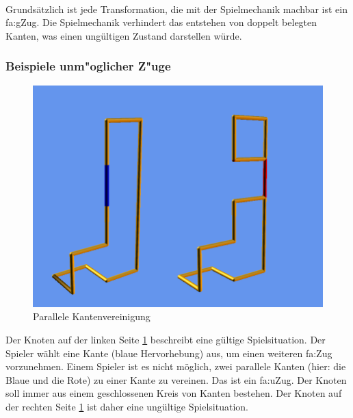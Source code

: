 ~\\
Grundsätzlich ist jede Transformation, die mit der Spielmechanik machbar ist ein \gls{fa:gZug}.
Die Spielmechanik verhindert das entstehen von doppelt belegten Kanten, was einen ungültigen Zustand darstellen würde.



\subsubsection{Beispiele unm{"o}glicher Z{"u}ge}
	\begin{figure}[htb]
	  \centering
	  \includegraphics[width = \textwidth]{Inhalt/Nutzung/Grafiken/Grafische_Oberflaechen/Ungueltiger_Zug.png}
	  \caption{Parallele Kantenvereinigung}
	  \label{fig:zug1}
	\end{figure}
Der Knoten auf der linken Seite \ref{fig:zug1} beschreibt eine gültige Spielsituation. Der Spieler wählt eine Kante (blaue Hervorhebung) aus, um einen weiteren \gls{fa:Zug} vorzunehmen.
Einem Spieler ist es nicht möglich, zwei parallele Kanten (hier: die Blaue und die Rote) zu einer Kante zu vereinen. Das ist ein \gls{fa:uZug}. Der Knoten soll immer aus einem geschlossenen Kreis von Kanten bestehen. Der Knoten auf der rechten Seite \ref{fig:zug1} ist daher eine ungültige Spielsituation.

\clearpage


